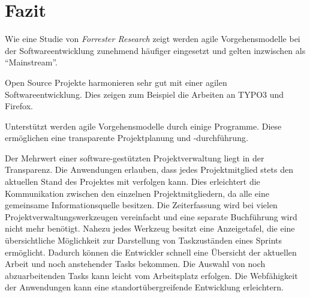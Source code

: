 \section{Fazit}
Wie eine Studie von \emph{Forrester Research} zeigt werden agile Vorgehensmodelle bei der Softwareentwicklung zunehmend häufiger eingesetzt und gelten inzwischen als ``Mainstream''. \cite{bib:ane} 

Open Source Projekte harmonieren sehr gut mit einer agilen Softwareentwicklung. Dies zeigen zum Beispiel die Arbeiten an TYPO3 und Firefox. 

Unterstützt werden agile Vorgehensmodelle durch einige Programme. Diese ermöglichen eine transparente Projektplanung und -durchführung.

Der Mehrwert einer software-gestützten Projektverwaltung liegt in der Transparenz. Die Anwendungen erlauben, dass jedes Projektmitglied stets den aktuellen Stand des Projektes mit verfolgen kann. Dies erleichtert die Kommunikation zwischen den einzelnen Projektmitgliedern, da alle eine gemeinsame Informationsquelle besitzen. Die Zeiterfassung wird bei vielen Projektverwaltungswerkzeugen vereinfacht und eine separate Buchführung wird nicht mehr benötigt. Nahezu jedes Werkzeug besitzt eine Anzeigetafel, die eine übersichtliche Möglichkeit zur Darstellung von Taskzuständen eines Sprints ermöglicht. Dadurch können die Entwickler schnell eine Übersicht der aktuellen Arbeit und noch anstehender Tasks bekommen. Die Auswahl von noch abzuarbeitenden Tasks kann leicht vom Arbeitsplatz erfolgen. Die Webfähigkeit der Anwendungen kann eine standortübergreifende Entwicklung erleichtern.
